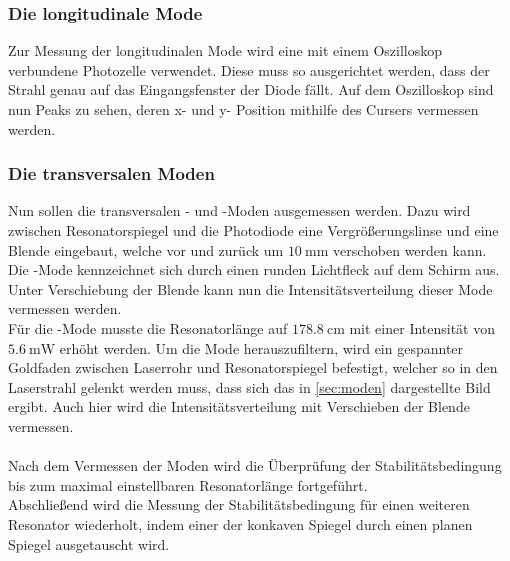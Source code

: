 \subsubsection{Die longitudinale Mode}

    Zur Messung der longitudinalen Mode wird eine mit einem Oszilloskop verbundene Photozelle verwendet.
    Diese muss so ausgerichtet werden,
    dass der Strahl genau auf das Eingangsfenster der Diode fällt.
    Auf dem Oszilloskop sind nun Peaks zu sehen,
    deren x- und y- Position mithilfe des Cursers vermessen werden.

\subsubsection{Die transversalen Moden}

    Nun sollen die transversalen - und -Moden ausgemessen werden.
    Dazu wird zwischen Resonatorspiegel und die Photodiode eine Vergrößerungslinse und eine Blende eingebaut,
    welche vor und zurück um $\SI{10}{\milli\meter}$ verschoben werden kann.\\
    Die -Mode kennzeichnet sich durch einen runden Lichtfleck auf dem Schirm aus.
    Unter Verschiebung der Blende kann nun die Intensitätsverteilung dieser Mode vermessen werden.\\
    Für die -Mode musste die Resonatorlänge auf $\SI{178.8}{\centi\meter}$ mit einer Intensität von $\SI{5.6}{\milli\watt}$ erhöht werden.
    Um die Mode herauszufiltern,
    wird ein gespannter Goldfaden zwischen Laserrohr und Resonatorspiegel befestigt,
    welcher so in den Laserstrahl gelenkt werden muss,
    dass sich das in \autoref{sec:moden} dargestellte Bild ergibt.
    Auch hier wird die Intensitätsverteilung mit Verschieben der Blende vermessen.\\
    \\
    Nach dem Vermessen der Moden wird die Überprüfung der Stabilitätsbedingung bis zum maximal einstellbaren Resonatorlänge fortgeführt.\\
    Abschließend wird die Messung der Stabilitätsbedingung für einen weiteren Resonator wiederholt,
    indem einer der konkaven Spiegel durch einen planen Spiegel ausgetauscht wird.
